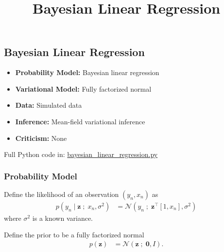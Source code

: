 \title{Bayesian Linear Regression}

\subsection{Bayesian Linear Regression}

\begin{itemize}
  \item \textbf{Probability Model:} Bayesian linear regression
  \item \textbf{Variational Model:} Fully factorized normal
  \item \textbf{Data:} Simulated data
  \item \textbf{Inference:} Mean-field variational inference
  \item \textbf{Criticism:} None
\end{itemize}

Full Python code in: 
\href{https://github.com/blei-lab/edward/blob/master/examples/bayesian_linear_regression.py}
{bayesian_linear_regression.py}


\subsubsection{Probability Model}
Define the likelihood of an observation $(y_n, x_n)$ as
\begin{align*}
  p(y_n \mid \mathbf{z} \;;\; x_n, \sigma^2)
  &=
  \mathcal{N}(y_n \;;\; \mathbf{z}^\top [1, x_n], \sigma^2)
\end{align*}
where $\sigma^2$ is a known variance.

Define the prior to be a fully factorized normal
\begin{align*}
  p(\mathbf{z})
  &=
  \mathcal{N}(\mathbf{z} \;;\; \mathbf{0}, I).
\end{align*} 

